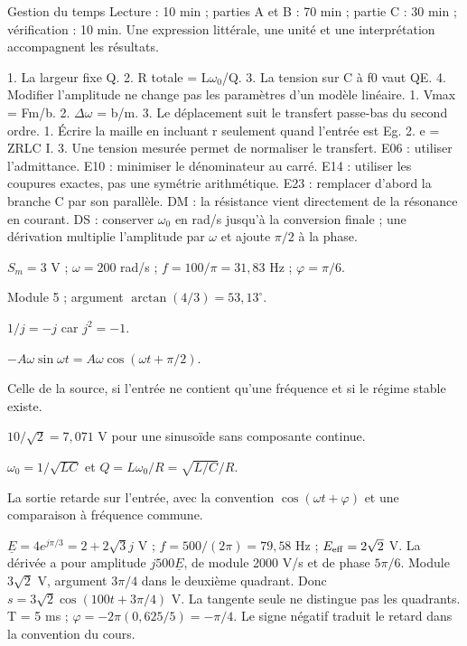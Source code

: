 \begin{docu}{Gestion du temps}
Lecture : 10 min ; parties A et B : 70 min ; partie C : 30 min ; vérification : 10 min. Une expression littérale, une unité et une interprétation accompagnent les résultats.
\end{docu}


1. La largeur fixe Q. 2. R totale = L\ensuremath{\omega_0}/Q. 3. La tension sur C à f0 vaut QE. 4. Modifier l’amplitude ne change pas les paramètres d’un modèle linéaire.
1. Vmax = Fm/b. 2. \ensuremath{\Delta}\ensuremath{\omega} = b/m. 3. Le déplacement suit le transfert passe-bas du second ordre.
1. Écrire la maille en incluant r seulement quand l’entrée est Eg. 2. e = ZRLC I. 3. Une tension mesurée permet de normaliser le transfert.
E06 : utiliser l’admittance. E10 : minimiser le dénominateur au carré. E14 : utiliser les coupures exactes, pas une symétrie arithmétique. E23 : remplacer d’abord la branche C par son parallèle.
DM : la résistance vient directement de la résonance en courant. DS : conserver $\omega_0$ en rad/s jusqu’à la conversion finale ; une dérivation multiplie l’amplitude par $\omega$ et ajoute $\pi/2$ à la phase.


$S_m=3$ V ; $\omega=200$ rad/s ; $f=100/\pi=31{,}83$ Hz ; $\varphi=\pi/6$.

Module 5 ; argument $\arctan(4/3)=53{,}13^\circ$.

$1/j=-j$ car $j^2=-1$.

$-A\omega\sin\omega t=A\omega\cos(\omega t+\pi/2)$.

Celle de la source, si l’entrée ne contient qu’une fréquence et si le régime stable existe.

$10/\sqrt2=7{,}071$ V pour une sinusoïde sans composante continue.

$\omega_0=1/\sqrt{LC}$ et $Q=L\omega_0/R=\sqrt{L/C}/R$.

La sortie retarde sur l’entrée, avec la convention $\cos(\omega t+\varphi)$ et une comparaison à fréquence commune.


$\underline E=4e^{j\pi/3}=2+2\sqrt3j$ V ; $f=500/(2\pi)=79{,}58$ Hz ; $E_{\rm eff}=2\sqrt2$ V. La dérivée a pour amplitude $j500\underline E$, de module 2000 V/s et de phase $5\pi/6$.
Module $3\sqrt2$ V, argument $3\pi/4$ dans le deuxième quadrant. Donc $s=3\sqrt2\cos(100t+3\pi/4)$ V. La tangente seule ne distingue pas les quadrants.
T = 5 ms ; $\varphi=-2\pi(0{,}625/5)=-\pi/4$. Le signe négatif traduit le retard dans la convention du cours.


